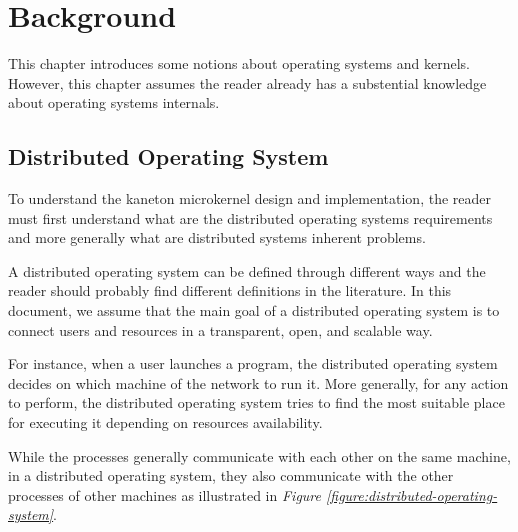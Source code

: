 %
%
%
%
%
%

%
%

\chapter{Background}
\label{chapter:background}

This chapter introduces some notions about operating systems and kernels.
However, this chapter assumes the reader already has a substential knowledge
about operating systems internals.

\newpage

%
%

%
%

\section{Distributed Operating System}

To understand the kaneton microkernel design and implementation, the reader
must first understand what are the distributed operating systems requirements
and more generally what are distributed systems inherent problems.

A distributed operating system can be defined through different ways and
the reader should probably find different definitions in the literature. In
this document, we assume that the main goal of a distributed operating
system is to connect users and resources in a transparent, open, and scalable
way.

For instance, when a user launches a program, the distributed operating system
decides on which machine of the network to run it. More generally, for
any action to perform, the distributed operating system tries to find the
most suitable place for executing it depending on resources availability.

While the processes generally communicate with each other on the same
machine, in a distributed operating system, they also communicate with the
other processes of other machines as illustrated in \textit{Figure
\ref{figure:distributed-operating-system}}.

